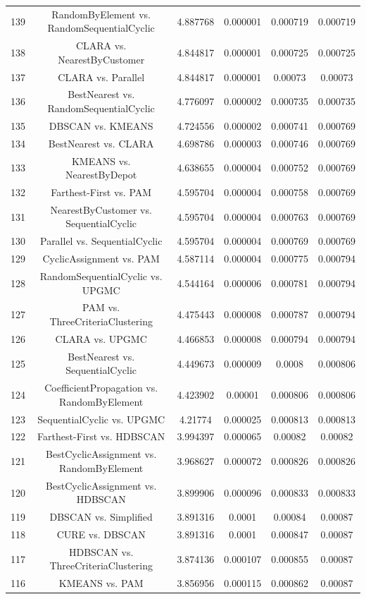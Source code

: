\documentclass[a4paper,10pt]{article}
\begin{document}
\begin{landscape}
\begin{table}[!htp]
\begin{tabular}{cccccc}
139&RandomByElement vs. RandomSequentialCyclic&4.887768&0.000001&0.000719&0.000719\\
138&CLARA vs. NearestByCustomer&4.844817&0.000001&0.000725&0.000725\\
137&CLARA vs. Parallel&4.844817&0.000001&0.00073&0.00073\\
136&BestNearest vs. RandomSequentialCyclic&4.776097&0.000002&0.000735&0.000735\\
135&DBSCAN vs. KMEANS&4.724556&0.000002&0.000741&0.000769\\
134&BestNearest vs. CLARA&4.698786&0.000003&0.000746&0.000769\\
133&KMEANS vs. NearestByDepot&4.638655&0.000004&0.000752&0.000769\\
132&Farthest-First vs. PAM&4.595704&0.000004&0.000758&0.000769\\
131&NearestByCustomer vs. SequentialCyclic&4.595704&0.000004&0.000763&0.000769\\
130&Parallel vs. SequentialCyclic&4.595704&0.000004&0.000769&0.000769\\
129&CyclicAssignment vs. PAM&4.587114&0.000004&0.000775&0.000794\\
128&RandomSequentialCyclic vs. UPGMC&4.544164&0.000006&0.000781&0.000794\\
127&PAM vs. ThreeCriteriaClustering&4.475443&0.000008&0.000787&0.000794\\
126&CLARA vs. UPGMC&4.466853&0.000008&0.000794&0.000794\\
125&BestNearest vs. SequentialCyclic&4.449673&0.000009&0.0008&0.000806\\
124&CoefficientPropagation vs. RandomByElement&4.423902&0.00001&0.000806&0.000806\\
123&SequentialCyclic vs. UPGMC&4.21774&0.000025&0.000813&0.000813\\
122&Farthest-First vs. HDBSCAN&3.994397&0.000065&0.00082&0.00082\\
121&BestCyclicAssignment vs. RandomByElement&3.968627&0.000072&0.000826&0.000826\\
120&BestCyclicAssignment vs. HDBSCAN&3.899906&0.000096&0.000833&0.000833\\
119&DBSCAN vs. Simplified&3.891316&0.0001&0.00084&0.00087\\
118&CURE vs. DBSCAN&3.891316&0.0001&0.000847&0.00087\\
117&HDBSCAN vs. ThreeCriteriaClustering&3.874136&0.000107&0.000855&0.00087\\
116&KMEANS vs. PAM&3.856956&0.000115&0.000862&0.00087\\

\end{tabular}
\end{table}
\end{landscape}
\end{document}
